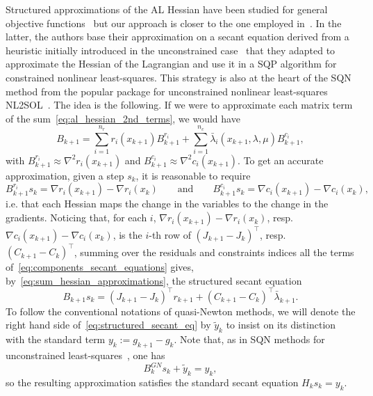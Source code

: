 Structured approximations of the AL Hessian have been studied for general objective functions~\cite{tapia:1988} but our approach is closer to the one employed in~\cite{li-etal:2002}. In the latter, the authors base their approximation on a secant equation derived from a heuristic initially introduced in the unconstrained case~\cite{biggs:1977} that they adapted to approximate the Hessian of the Lagrangian and use it in a SQP algorithm for constrained nonlinear least-squares. This strategy is also at the heart of the SQN method from the popular package for unconstrained nonlinear least-squares NL2SOL~\cite{dennisetal:1981,dennis-etal:1989}. The idea is the following. If we were to approximate each matrix term of the sum~\eqref{eq:al_hessian_2nd_terms}, we would have
\begin{equation}\label{eq:sum_hessian_approximations}
	B_{k+1} = \sum_{i=1}^{n_r}  r_i(x_{k+1}) B^{r_i}_{k+1} + \sum_{i=1}^{n_c} \bar{\lambda}_i(x_{k+1},\lambda,\mu) B^{c_i}_{k+1},
\end{equation}
with $B^{r_i}_{k+1} \approx \nabla^2r_i(x_{k+1})$ and $B^{c_i}_{k+1} \approx  \nabla^2 c_i(x_{k+1})$. To get an accurate approximation, given a step $s_k$, it is reasonable to require
\begin{equation}\label{eq:components_secant_equations}
	B^{r_i}_{k+1}s_k = \nabla r_i(x_{k+1}) - \nabla r_i(x_k) \qquad \text{and} \qquad B^{c_i}_{k+1}s_k = \nabla c_i(x_{k+1}) - \nabla c_i(x_k),
\end{equation}
i.e. that each Hessian maps the change in the variables to the change in the gradients. Noticing that, for each $i$, $\nabla r_i(x_{k+1}) - \nabla r_i(x_k)$, resp. $\nabla c_i(x_{k+1}) - \nabla c_i(x_k)$, is the $i$-th row of $\left(J_{k+1}-J_k\right)^\top$, resp. $\left(C_{k+1}-C_k\right)^\top$, summing over the residuals and constraints indices all the terms of~\eqref{eq:components_secant_equations} gives, by~\eqref{eq:sum_hessian_approximations}, the structured secant equation
\begin{equation}\label{eq:structured_secant_eq}
	B_{k+1}s_k = \left(J_{k+1}-J_k\right)^\top r_{k+1} + \left(C_{k+1}-C_k\right)^\top\bar{\lambda}_{k+1}.
\end{equation}
To follow the conventional notations of quasi-Newton methods, we will denote the right hand side of~\eqref{eq:structured_secant_eq} by $\tilde{y}_k$ to insist on its distinction with the standard term $y_k:= g_{k+1}-g_k$. Note that, as in SQN methods for unconstrained least-squares~\cite{lucksan-etal:2019}, one has
\[B^{GN}_ks_k + \tilde{y}_k = y_k,\]
so the resulting approximation satisfies the standard secant equation $H_ks_k = y_k$.

